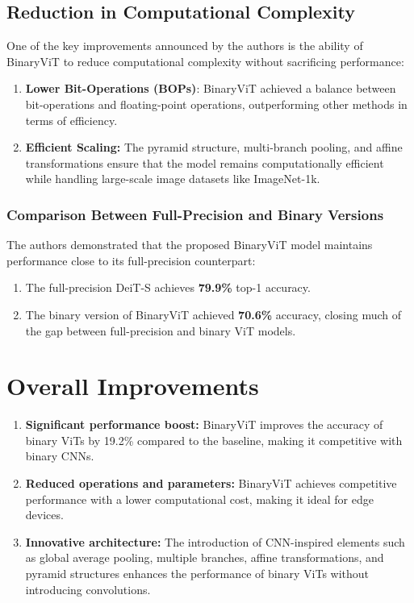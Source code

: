 \documentclass{report}
\begin{document}
	
	
	\subsection{Reduction in Computational Complexity}
	One of the key improvements announced by the authors is the ability of BinaryViT to reduce computational complexity without sacrificing performance:
	
	\begin{enumerate}
		\item 
		\textbf{Lower Bit-Operations (BOPs)}: BinaryViT achieved a balance between bit-operations and floating-point operations, outperforming other methods in terms of efficiency.
		
		\item 
		\textbf{Efficient Scaling:} The pyramid structure, multi-branch pooling, and affine transformations ensure that the model remains computationally efficient while handling large-scale image datasets like ImageNet-1k.
	\end{enumerate}
	
	
	\subsubsection{Comparison Between Full-Precision and Binary Versions}
	The authors demonstrated that the proposed BinaryViT model maintains performance close to its full-precision counterpart:
	
	\begin{enumerate}
		\item 
		The full-precision DeiT-S achieves \textbf{79.9\%} top-1 accuracy.
		
		\item 
		The binary version of BinaryViT achieved \textbf{70.6\%} accuracy, closing much of the gap between full-precision and binary ViT models.
	\end{enumerate}
	
	
	\section{Overall Improvements}
	\begin{enumerate}
		\item 
		\textbf{Significant performance boost:} BinaryViT improves the accuracy of binary ViTs by 19.2\% compared to the baseline, making it competitive with binary CNNs.
		
		\item 
		\textbf{Reduced operations and parameters:} BinaryViT achieves competitive performance with a lower computational cost, making it ideal for edge devices.
		
		\item 
		\textbf{Innovative architecture:} The introduction of CNN-inspired elements such as global average pooling, multiple branches, affine transformations, and pyramid structures enhances the performance of binary ViTs without introducing convolutions.
	\end{enumerate}
	
\end{document}
